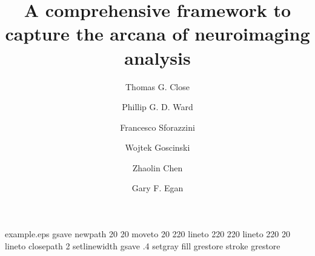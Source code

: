 %
%
%
%
%
\begin{filecontents*}{example.eps}
gsave
newpath
  20 20 moveto
  20 220 lineto
  220 220 lineto
  220 20 lineto
closepath
2 setlinewidth
gsave
  .4 setgray fill
grestore
stroke
grestore
\end{filecontents*}
%
\RequirePackage{fix-cm}
%
\documentclass[smallextended]{svjour3}       %
%
\smartqed  %
%
\usepackage{graphicx}
\usepackage{hyperref}
\usepackage{longtable}
\usepackage{booktabs}
%
%
%
%
%


\title{A comprehensive framework to capture the arcana of neuroimaging
analysis%
}


\author{
	Thomas G. Close \and
	Phillip G. D. Ward  \and
	Francesco Sforazzini  \and
	Wojtek Goscinski  \and
	Zhaolin Chen  \and
	Gary F. Egan  \and
}


